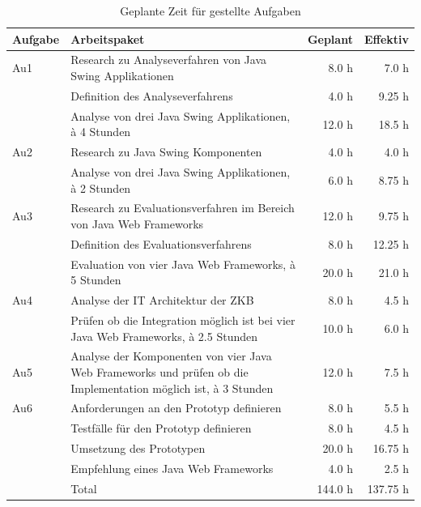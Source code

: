   \begin{table}[p]
    \sffamily 
    \begin{center}
      \begin{tabular}{lp{7cm}rr}
        \toprule
        \textbf{Aufgabe} & \textbf{Arbeitspaket} & \textbf{Geplant} &
        \textbf{Effektiv}\\

        \midrule
        Au1 &
        Research zu Analyseverfahren von Java Swing Applikationen &
        8.0 h &
        7.0 h\\
        &
        Definition des Analyseverfahrens &
        4.0 h &
        9.25 h\\
        &
        Analyse von drei Java Swing Applikationen, à 4 Stunden &
        12.0 h &
        18.5 h\\

        \midrule
        Au2 &
        Research zu Java Swing Komponenten &
        4.0 h &
        4.0 h\\
        &
        Analyse von drei Java Swing Applikationen, à 2 Stunden &
        6.0 h &
        8.75 h\\

        \midrule
        Au3 &
        Research zu Evaluationsverfahren im Bereich von Java Web Frameworks &
        12.0 h &
        9.75 h\\
        &
        Definition des Evaluationsverfahrens &
        8.0 h &
        12.25 h\\
        &
        Evaluation von vier Java Web Frameworks, à 5 Stunden &
        20.0 h &
        21.0 h\\

        \midrule
        Au4 &
        Analyse der IT Architektur der ZKB &
        8.0 h &
        4.5 h\\
        &
        Prüfen ob die Integration möglich ist bei vier Java Web Frameworks, à
        2.5 Stunden &
        10.0 h &
        6.0 h\\
        
        \midrule
        Au5 &
        Analyse der Komponenten von vier Java Web Frameworks und prüfen ob die
        Implementation möglich ist, à 3 Stunden &
        12.0 h &
        7.5 h\\
        
        \midrule
        Au6 &
        Anforderungen an den Prototyp definieren &
        8.0 h &
        5.5 h\\
        &
        Testfälle für den Prototyp definieren &
        8.0 h &
        4.5 h\\
        &
        Umsetzung des Prototypen &
        20.0 h &
        16.75 h\\
        &
        Empfehlung eines Java Web Frameworks &
        4.0 h &
        2.5 h\\
        \bottomrule
        &
        Total &
        144.0 h &
        137.75 h\\
        \bottomrule
      \end{tabular}
      \caption{Geplante Zeit für gestellte Aufgaben}
      \label{tab:aufgabenPlaning}
    \end{center}
  \end{table}
  
